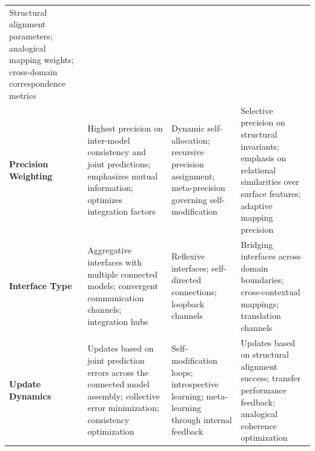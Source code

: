 \documentclass[
  11pt,
  letterpaper,
]{article}
\begin{document}
\begin{longtable}[]{@{}llll@{}}
\begin{minipage}[t]{0.27\columnwidth}
Structural alignment parameters; analogical mapping weights;
cross-domain correspondence metrics\strut
\end{minipage}\tabularnewline
\begin{minipage}[t]{0.11\columnwidth}\raggedright
\textbf{Precision Weighting}\strut
\end{minipage} & \begin{minipage}[t]{0.26\columnwidth}\raggedright
Highest precision on inter-model consistency and joint predictions;
emphasizes mutual information; optimizes integration factors\strut
\end{minipage} & \begin{minipage}[t]{0.24\columnwidth}\raggedright
Dynamic self-allocation; recursive precision assignment; meta-precision
governing self-modification\strut
\end{minipage} & \begin{minipage}[t]{0.27\columnwidth}\raggedright
Selective precision on structural invariants; emphasis on relational
similarities over surface features; adaptive mapping precision\strut
\end{minipage}\tabularnewline
\begin{minipage}[t]{0.11\columnwidth}\raggedright
\textbf{Interface Type}\strut
\end{minipage} & \begin{minipage}[t]{0.26\columnwidth}\raggedright
Aggregative interfaces with multiple connected models; convergent
communication channels; integration hubs\strut
\end{minipage} & \begin{minipage}[t]{0.24\columnwidth}\raggedright
Reflexive interfaces; self-directed connections; loopback channels\strut
\end{minipage} & \begin{minipage}[t]{0.27\columnwidth}\raggedright
Bridging interfaces across domain boundaries; cross-contextual mappings;
translation channels\strut
\end{minipage}\tabularnewline
\begin{minipage}[t]{0.11\columnwidth}\raggedright
\textbf{Update Dynamics}\strut
\end{minipage} & \begin{minipage}[t]{0.26\columnwidth}\raggedright
Updates based on joint prediction errors across the connected model
assembly; collective error minimization; consistency optimization\strut
\end{minipage} & \begin{minipage}[t]{0.24\columnwidth}\raggedright
Self-modification loops; introspective learning; meta-learning through
internal feedback\strut
\end{minipage} & \begin{minipage}[t]{0.27\columnwidth}\raggedright
Updates based on structural alignment success; transfer performance
feedback; analogical coherence optimization\strut
\end{minipage}\tabularnewline
\bottomrule
\end{longtable}
\end{document}
